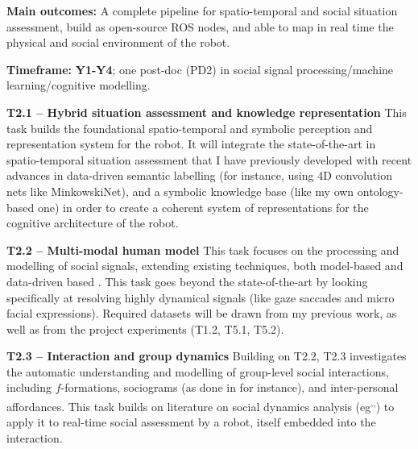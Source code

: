 \begin{framed}
    \textbf{Main outcomes:} A complete pipeline for spatio-temporal and social
    situation assessment, build as open-source ROS nodes, and able to map in
    real time the physical and social environment of the robot.

    \textbf{Timeframe:} \textbf{Y1-Y4}; one post-doc (PD2) in social
signal processing/machine learning/cognitive modelling.
\end{framed}

\textbf{T2.1 -- Hybrid situation assessment and knowledge representation} This
task builds the foundational spatio-temporal and symbolic perception and
representation system for the robot. It will integrate the state-of-the-art in
spatio-temporal situation assessment that I have previously
developed with recent
advances in data-driven semantic labelling (for instance, using 4D convolution
nets like MinkowskiNet), and a symbolic knowledge base (like
my own ontology-based one) in order to create a coherent
system of representations for the cognitive architecture of the robot.

\textbf{T2.2 -- Multi-modal human model} This task focuses on the processing and
modelling of social signals, extending existing techniques, both
model-based and
data-driven based . This task goes beyond the
state-of-the-art by looking specifically at resolving highly dynamical signals
(like gaze saccades and micro facial expressions). Required datasets will be
drawn from my previous work, as well as from
the project experiments (T1.2, T5.1, T5.2).

\textbf{T2.3 -- Interaction and group dynamics} Building on T2.2, T2.3
investigates the automatic understanding and modelling of group-level social
interactions, including
$f$-formations, sociograms (as done
in for instance), and inter-personal
affordances. This task builds on literature on
social dynamics analysis
(eg\textsuperscript{,}\textsuperscript{,})
to apply it to real-time social assessment by a robot, itself embedded into the
interaction.

